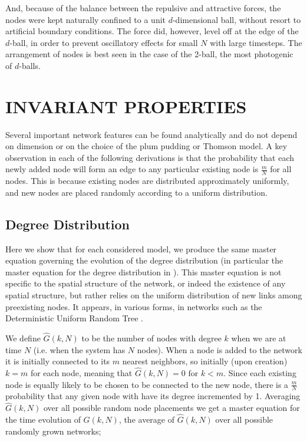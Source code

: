 \documentclass[aps,pre,reprint,superscriptaddress,amsmath,amssymb]{revtex4-1}
\begin{document}
And, because of the balance between the repulsive and attractive forces, the nodes were kept naturally confined to a unit $d$-dimensional ball, without resort to artificial boundary conditions.  
The force did, however, level off at the edge of the $d$-ball, in order to prevent oscillatory effects for small $N$ with large timesteps.  
The arrangement of nodes is best seen in the case of the 2-ball, the most photogenic of $d$-balls.  

\section{INVARIANT PROPERTIES}
Several important network features can be found analytically and do not depend on dimension or on the choice of the plum pudding or Thomson model.
A key observation in each of the following derivations is that the probability that each newly added node will form an edge to any particular existing node is $\frac{m}{N}$ for all nodes.
This is because existing nodes are distributed approximately uniformly, and new nodes are placed randomly according to a uniform distribution.

\subsection{Degree Distribution}
Here we show that for each considered model, we produce the same master equation governing the evolution of the degree distribution (in particular the master equation for the degree distribution in \cite{ozik2004}).  
This master equation is not specific to the spatial structure of the network, or indeed the existence of any spatial structure, but rather relies on the uniform distribution of new links among preexisting nodes.  
It appears, in various forms, in networks such as the Deterministic Uniform Random Tree \cite{zhang2008topologies}.

We define $\hat{G}(k,N)$ to be the number of nodes with degree $k$ when we are at time $N$ (i.e. when the system has $N$ nodes).
When a node is added to the network it is initially connected to its $m$ nearest neighbors, so initially (upon creation) $k = m$ for each node, meaning that $\hat{G}(k,N) = 0 \text{ for } k < m$.
Since each existing node is equally likely to be chosen to be connected to the new node, there is a $\frac{m}{N}$ probability that any given node with have its degree incremented by 1.
Averaging $\hat{G}(k,N)$ over all possible random node placements we get a master equation for the time evolution of $G(k,N)$, the average of $\hat{G}(k,N)$ over all possible randomly grown networks;
\end{document}

